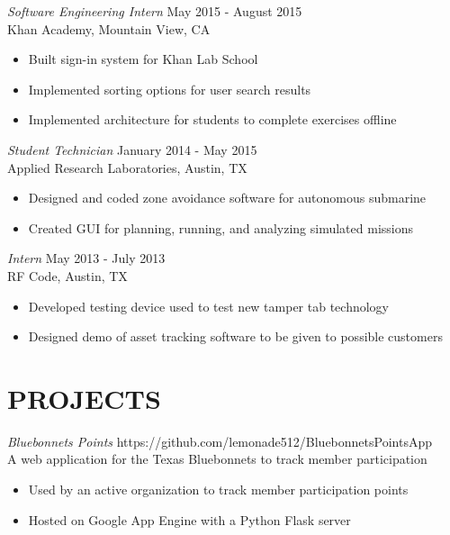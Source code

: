 \documentclass[margin,11pt]{res}
\begin{document}
\begin{resume}
    {\sl Software Engineering Intern} \hfill   May 2015 - August 2015 \\
    Khan Academy, Mountain View, CA
    \begin{itemize} \itemsep -2pt %
        \item Built sign-in system for Khan Lab School
        \item Implemented sorting options for user search results
        \item Implemented architecture for students to complete exercises offline
    \end{itemize}

    {\sl Student Technician} \hfill            January 2014 - May 2015 \\
    Applied Research Laboratories, Austin, TX
    \begin{itemize}  \itemsep -2pt %
        \item Designed and coded zone avoidance software for autonomous submarine
        \item Created GUI for planning, running, and analyzing simulated missions
    \end{itemize}

    {\sl Intern} \hfill May 2013 - July 2013 \\
    RF Code, Austin, TX
    \begin{itemize}  \itemsep -2pt %
        \item Developed testing device used to test new tamper tab technology
        \item Designed demo of asset tracking software to be given to possible customers
    \end{itemize}

\section{PROJECTS}
    {\sl Bluebonnets Points} \hfill https://github.com/lemonade512/BluebonnetsPointsApp \\
    A web application for the Texas Bluebonnets to track member participation
    \begin{itemize} \itemsep -2pt
        \item Used by an active organization to track member participation points
        \item Hosted on Google App Engine with a Python Flask server
    \end{itemize}


\end{resume}
\end{document}
